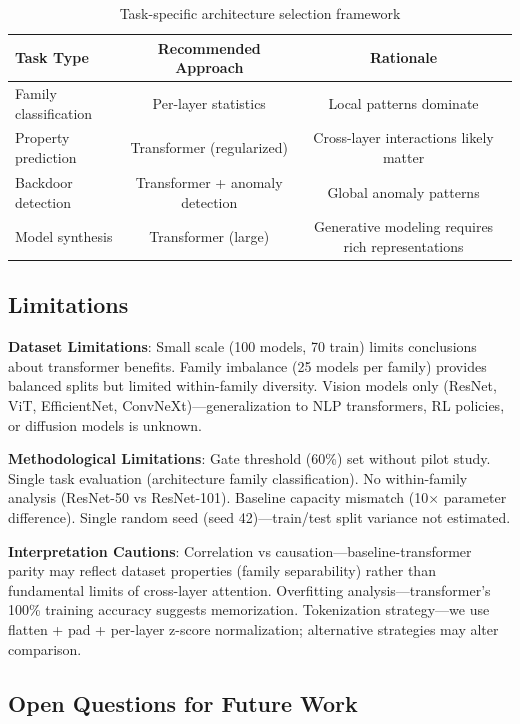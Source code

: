 \begin{table}[h]
\centering
\begin{tabular}{lcc}
\toprule
Task Type & Recommended Approach & Rationale \\
\midrule
Family classification & Per-layer statistics & Local patterns dominate \\
Property prediction & Transformer (regularized) & Cross-layer interactions likely matter \\
Backdoor detection & Transformer + anomaly detection & Global anomaly patterns \\
Model synthesis & Transformer (large) & Generative modeling requires rich representations \\
\bottomrule
\end{tabular}
\caption{Task-specific architecture selection framework}
\end{table}

\subsection{Limitations}

\textbf{Dataset Limitations}: Small scale (100 models, 70 train) limits conclusions about transformer benefits. Family imbalance (25 models per family) provides balanced splits but limited within-family diversity. Vision models only (ResNet, ViT, EfficientNet, ConvNeXt)---generalization to NLP transformers, RL policies, or diffusion models is unknown.

\textbf{Methodological Limitations}: Gate threshold (60\%) set without pilot study. Single task evaluation (architecture family classification). No within-family analysis (ResNet-50 vs ResNet-101). Baseline capacity mismatch (10$\times$ parameter difference). Single random seed (seed 42)---train/test split variance not estimated.

\textbf{Interpretation Cautions}: Correlation vs causation---baseline-transformer parity may reflect dataset properties (family separability) rather than fundamental limits of cross-layer attention. Overfitting analysis---transformer's 100\% training accuracy suggests memorization. Tokenization strategy---we use flatten + pad + per-layer z-score normalization; alternative strategies may alter comparison.

\subsection{Open Questions for Future Work}

